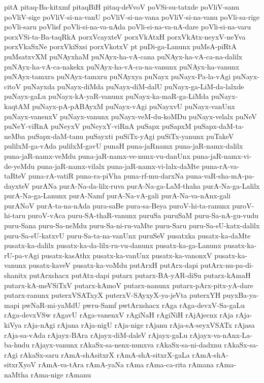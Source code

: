 {pitA
pitaq-Ba-kitxmf
pitaqBiH
pitaq-deVvoV
poVSi-su-tatxde
poVliV-sanu
poVliV-sige
poVliV-si-na-vanU
poVliV-si-na-vana
poVliV-si-na-vanu
poVli-sa-rige
poVli-saru
poVlisf
poVli-si-na-va-nAda
poVli-si-na-va-nA-dare
poVli-si-na-varu
porxVSi-ta-Ba-taqRkA
porxVcayxteV
porxVkAtxH
porxVkAtx-neyxV-neYva
porxVkaSxNe
porxVkiSxsi
porxVkotxV
pt
puDi-ga-Lanunx
puMsA-piRtA
puMsatxvXM
puNAyxhaM
puNAyx-ha-vA-cana
puNAyx-ha-vA-ca-na-dalilx
puNAyx-ha-vA-ca-nakekx
puNAyx-ha-vA-ca-na-vanunx
puNAyx-ha-vanunx
puNAyx-tamxra
puNAyx-tamxru
puNAyxya
puNayx
puNayx-Pa-la-vAgi
puNayx-citoV
puNayxda
puNayx-diMda
puNayx-diM-dalU
puNayx-ga-LiM-da-lalxde
puNayx-gaLu
puNayx-kA-yaR-vanunx
puNayx-ka-maR-ga-LiMda
puNayx-kaqtAM
puNayx-pA-pABAyxM
puNayx-vAgi
puNayxvU
puNayx-vanUnx
puNayx-vanenxV
puNayx-vanunx
puNayx-veM-du-koMDu
puNayx-velalx
puNeV
puNeY-viRnA
puNeyxV
puNeyxY-viRnA
puSapx
puSapxM
puSapx-daM-ta-neMba
puSapx-daM-tanu
puSayxti
puSiTx-yAgi
puSiTx-yanunx
puTakeV
pulilxM-ga-vAda
pulilxM-gavU
punaH
puna-jaRnamx
puna-jaR-namx-dalilx
puna-jaR-namx-veMdu
puna-jaR-namx-ve-nunx-vu-danUnx
puna-jaR-namx-vi-de-yeMdu
puna-jaR-namx-vilalx
puna-jaR-namx-vi-lalx-daMte
puna-rA-va-taRteV
puna-rA-vatiR
puna-ra-piVha
puna-rf-mu-darxNa
puna-vaR-sha-mA-pa-dayxteV
purANa
purA-Na-da-lilx-ruva
purA-Na-ga-LaM-thaha
purA-Na-ga-Lalilx
purA-Na-ga-Lanunx
purA-Namf
purA-Na-vA-gali
purA-Na-va-nAnx-gali
purANoV
purA-ta-na-nAda
pura-saBe
pura-sa-Beya
puroV-hi-ta-ranunx
puroV-hi-taru
puroV-vAca
puru-SA-thaR-vanunx
puruSa
puruSaM
puru-Sa-nA-gu-vudu
puru-Sana
puru-Sa-neMdu
puru-Sa-ni-ru-vaMte
puru-Saru
puru-Sa-sU-katx-dalilx
puru-Sa-sU-katxvU
puru-Sa-ta-na-vanUnx
puruSeV
pusatxka
pusatx-ka-daMte
pusatx-ka-dalilx
pusatx-ka-da-lilx-ru-vu-danunx
pusatx-ka-ga-Lanunx
pusatx-ka-rU-pa-vAgi
pusatx-kasAthx
pusatx-ka-vanUnx
pusatx-ka-vanonxV
pusatx-ka-vanunx
pusatx-kaveV
pusatx-ka-voMdu
putArxH
putArx-dapi
putArx-nu-pa-di-shanitx
putArxshacx
putAtx-dapi
putarx
putarx-BA-yAR-diSu
putarx-kAmaH
putarx-kA-meVSiTxV
putarx-kAmoV
putarx-nanunx
putarx-pArx-pitx-yA-dare
putarx-ranunx
puterxVSATxyX
puterxV-SAyxyX-ya-jeVta
puterxYH
puyxBa-ya-mapi
pwNaR-mi-yaMdU
pwru-Samf
pwtArxshacx
rAga
rAga-devxV-Sa-gaLu
rAga-devxVSw
rAgavU
rAga-vanenxV
rAgiNaH
rAgiNiH
rAjAjecnx
rAja
rAja-kiVya
rAja-nAgi
rAjana
rAja-nigU
rAja-nige
rAjanu
rAja-sA-seyxVSATx
rAjasa
rAja-sa-vAda
rAjayx-BAra
rAjayx-diM-daleV
rAjayx-gaLu
rAjayx-va-nAnx-La-ba-hudu
rAjayx-vanunx
rAkaSx-sa-nenx-nunxva
rAkaSx-sa-ni-dadxnu
rAkaSx-sa-rAgi
rAkaSx-saru
rAmA-shAsitxrX
rAmA-shA-sitxrX-gaLa
rAmA-shA-sitxrXyoV
rAmA-va-tAra
rAmA-yaNa
rAma
rAma-ca-rita
rAmana
rAma-naMtha
rAma-nige
rAmanu
}
